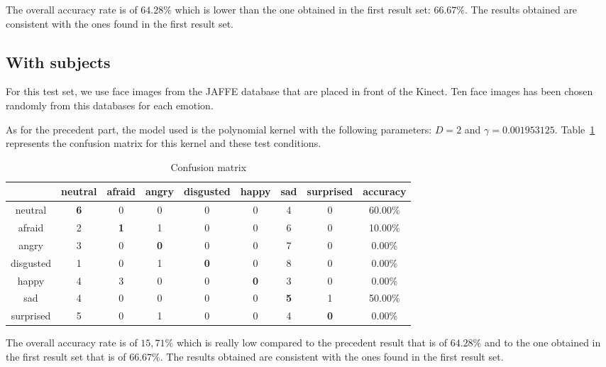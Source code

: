 \noindent The overall accuracy rate is of $ 64.28\% $ which is lower than the one obtained in the first result set: $ 66.67\% $. The results obtained are consistent with the ones found in the first result set.
\newline

\subsection{With subjects}

\vspace{\baselineskip}
\noindent For this test set, we use face images from the JAFFE database that are placed in front of the Kinect. Ten face images has been chosen randomly from this databases for each emotion.
\newline

\noindent As for the precedent part, the model used is the polynomial kernel with the following parameters: $ D = 2 $ and $ \gamma = 0.001953125 $. Table~\ref{table_results_confusion_matrix_kinect} represents the confusion matrix for this kernel and these test conditions.
\newline

\begin{table}[h]
\begin{center}
   \caption{\label{table_results_confusion_matrix_kinect} Confusion matrix}
\begin{tabular}{|c|c|c|c|c|c|c|c|c|}
  \hline
   & neutral & afraid & angry & disgusted & happy & sad & surprised & accuracy \\
  \hline
  neutral & \textbf{6} & 0 & 0 & 0 & 0 & 4 & 0 & 60.00\% \\
  afraid & 2 & \textbf{1} & 1 & 0 & 0 & 6 & 0 & 10.00\% \\
  angry & 3 & 0 & \textbf{0} & 0 & 0 & 7 & 0 & 0.00\% \\
  disgusted & 1 & 0 & 1 & \textbf{0} & 0 & 8 & 0 & 0.00\% \\
  happy & 4 & 3 & 0 & 0 & \textbf{0} & 3 & 0 & 0.00\% \\
  sad & 4 & 0 & 0 & 0 & 0 & \textbf{5} & 1 & 50.00\% \\
  surprised & 5 & 0 & 1 & 0 & 0 & 4 & \textbf{0} & 0.00\%\\
  \hline
\end{tabular}
\end{center}
\end{table}

\noindent The overall accuracy rate is of $ 15,71\% $ which is really low compared to the precedent result that is of $ 64.28\% $  and to the one obtained in the first result set that is of $ 66.67\% $. The results obtained are consistent with the ones found in the first result set.
\newline

